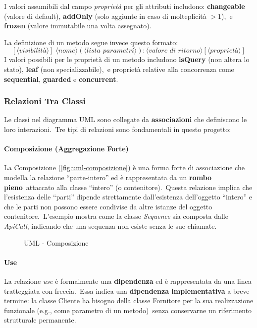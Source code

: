 I valori assumibili dal campo \textit{proprietà} per gli attributi includono: \textbf{changeable} (valore di default), \textbf{addOnly} (solo aggiunte in caso di molteplicità $>1$),\
e \textbf{frozen} (valore immutabile una volta assegnato).

La definizione di un metodo segue invece questo formato:
\[
    [\langle \textit{visibilità} \rangle] \;
    \langle \textit{nome} \rangle
    (\langle \textit{lista parametri} \rangle)
    : \langle \textit{valore di ritorno} \rangle
    [\langle \textit{proprietà} \rangle]
\]
I valori possibili per le proprietà di un metodo includono \textbf{isQuery} (non altera lo stato), \textbf{leaf} (non specializzabile),\
e proprietà relative alla concorrenza come \textbf{sequential}, \textbf{guarded} e \textbf{concurrent}.

\subsubsection{Relazioni Tra Classi}

Le classi nel diagramma UML sono collegate da \textbf{associazioni} che definiscono le loro interazioni.\
Tre tipi di relazioni sono fondamentali in questo progetto:

\paragraph{Composizione (Aggregazione Forte)}
La Composizione (\autoref{fig:uml-composizione}) è una forma forte di associazione che modella la relazione ``parte-intero'' ed è rappresentata da un \textbf{rombo pieno}\
attaccato alla classe ``intero'' (o contenitore).\
Questa relazione implica che l'esistenza delle ``parti'' dipende strettamente dall'esistenza dell'oggetto ``intero'' e che le parti non possono essere condivise da altre istanze del oggetto contenitore.\
L'esempio mostra come la classe \textit{Sequence} sia composta dalle \textit{ApiCall}, indicando che una sequenza non esiste senza le sue chiamate.

\begin{figure}[h!]
    \centering
    \adjustbox{max width=0.8\textwidth, max height=0.8\textheight}{%
        
    }
    \caption{UML - Composizione}
    \label{fig:uml-composizione}
\end{figure}

\paragraph{Use}
La relazione \textit{use} è formalmente una \textbf{dipendenza} ed è rappresentata da una linea tratteggiata con freccia.\
Essa indica una \textbf{dipendenza implementativa} a breve termine: la classe Cliente ha bisogno della classe Fornitore per la sua realizzazione funzionale (e.g., come parametro di un metodo)\
senza conservarne un riferimento strutturale permanente.

